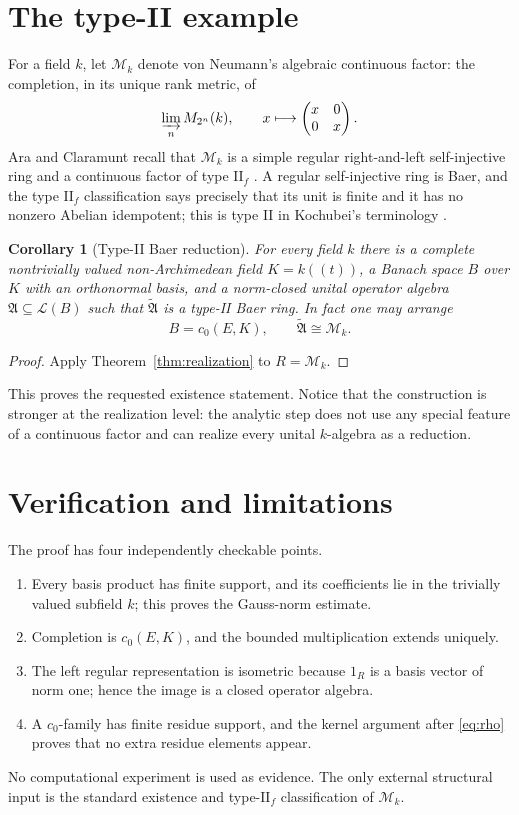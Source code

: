 \documentclass[11pt]{article}
\newtheorem{corollary}[theorem]{Corollary}
\newcommand{\cA}{\mathfrak A}
\newcommand{\cM}{\mathcal M}
\newcommand{\cL}{\mathcal L}
\begin{document}
\section{The type-II example}

For a field $k$, let $\cM_k$ denote von Neumann's algebraic continuous
factor: the completion, in its unique rank metric, of
\[
 \varinjlim_n M_{2^n}(k),\qquad x\longmapsto
 \begin{pmatrix}x&0\\0&x\end{pmatrix}.
\]
Ara and Claramunt recall that $\cM_k$ is a simple regular right-and-left
self-injective ring and a continuous factor of type $\mathrm{II}_f$
\cite[Introduction and Section~2]{AraClaramunt}.  A regular self-injective
ring is Baer, and the type $\mathrm{II}_f$ classification says precisely
that its unit is finite and it has no nonzero Abelian idempotent; this is
type II in Kochubei's terminology \cite{Goodearl,Kochubei}.

\begin{corollary}[Type-II Baer reduction]\label{cor:typeII}
For every field $k$ there is a complete nontrivially valued
non-Archimedean field $K=k((t))$, a Banach space $B$ over $K$ with an
orthonormal basis, and a norm-closed unital operator algebra
$\cA\subseteq\cL(B)$ such that $\widetilde{\cA}$ is a type-II Baer ring.
In fact one may arrange
\[
 B=c_0(E,K),\qquad \widetilde{\cA}\cong\cM_k.
\]
\end{corollary}

\begin{proof}
Apply Theorem~\ref{thm:realization} to $R=\cM_k$.
\end{proof}

This proves the requested existence statement.  Notice that the
construction is stronger at the realization level: the analytic step does
not use any special feature of a continuous factor and can realize every
unital $k$-algebra as a reduction.

\section{Verification and limitations}\label{sec:scope}

The proof has four independently checkable points.
\begin{enumerate}[leftmargin=*]
\item Every basis product has finite support, and its coefficients lie in
the trivially valued subfield $k$; this proves the Gauss-norm estimate.
\item Completion is $c_0(E,K)$, and the bounded multiplication extends
uniquely.
\item The left regular representation is isometric because $1_R$ is a
basis vector of norm one; hence the image is a closed operator algebra.
\item A $c_0$-family has finite residue support, and the kernel argument
after \eqref{eq:rho} proves that no extra residue elements appear.
\end{enumerate}
No computational experiment is used as evidence.  The only external
structural input is the standard existence and type-$\mathrm{II}_f$
classification of $\cM_k$.
\end{document}
